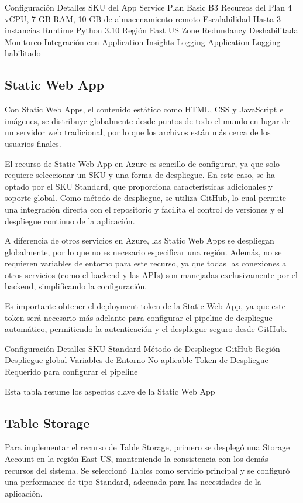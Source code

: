 Configuración	Detalles
SKU del App Service Plan	Basic B3
Recursos del Plan	4 vCPU, 7 GB RAM, 10 GB de almacenamiento remoto
Escalabilidad	Hasta 3 instancias
Runtime	Python 3.10
Región	East US
Zone Redundancy	Deshabilitada
Monitoreo	Integración con Application Insights
Logging	Application Logging habilitado

\subsection{Static Web App}

Con Static Web Apps, el contenido estático como HTML, CSS y JavaScript e imágenes, se distribuye globalmente desde puntos de todo el mundo en lugar de un servidor web tradicional, por lo que los archivos están más cerca de los usuarios finales.

El recurso de Static Web App en Azure es sencillo de configurar, ya que solo requiere seleccionar un SKU y una forma de despliegue. En este caso, se ha optado por el SKU Standard, que proporciona características adicionales y soporte global. Como método de despliegue, se utiliza GitHub, lo cual permite una integración directa con el repositorio y facilita el control de versiones y el despliegue continuo de la aplicación.

A diferencia de otros servicios en Azure, las Static Web Apps se despliegan globalmente, por lo que no es necesario especificar una región. Además, no se requieren variables de entorno para este recurso, ya que todas las conexiones a otros servicios (como el backend y las APIs) son manejadas exclusivamente por el backend, simplificando la configuración.

Es importante obtener el deployment token de la Static Web App, ya que este token será necesario más adelante para configurar el pipeline de despliegue automático, permitiendo la autenticación y el despliegue seguro desde GitHub.

Configuración	Detalles
SKU	Standard
Método de Despliegue	GitHub
Región	Despliegue global
Variables de Entorno	No aplicable
Token de Despliegue	Requerido para configurar el pipeline

Esta tabla resume los aspectos clave de la Static Web App

\subsection{Table Storage}

Para implementar el recurso de Table Storage, primero se desplegó una Storage Account en la región East US, manteniendo la consistencia con los demás recursos del sistema. Se seleccionó Tables como servicio principal y se configuró una performance de tipo Standard, adecuada para las necesidades de la aplicación.

